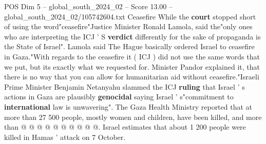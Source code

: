 \begin{textsample}{POS Dim 5 – global\_south\_2024\_02 – Score 13.00 – global\_south\_2024\_02/105742604.txt}
Ceasefire While the \textbf{court} stopped short of using the word"ceasefire"Justice Minister Ronald Lamola, said the"only ones who are interpreting the ICJ ' S \textbf{verdict} differently for the sake of propaganda is the State of Israel".
Lamola said The Hague basically ordered Israel to ceasefire in Gaza."With regards to the ceasefire it ( ICJ ) did not use the same words that we put, but its exactly what we requested for.
Minister Pandor explained it, that there is no way that you can allow for humanitarian aid without ceasefire."Israeli Prime Minister Benjamin Netanyahu slammed the ICJ \textbf{ruling} that Israel ' s actions in Gaza are plausibly \textbf{genocidal} saying Israel ' s"commitment to \textbf{international} law is unwavering".
The Gaza Health Ministry reported that at more than 27 500 people, mostly women and children, have been killed, and more than @ @ @ @ @ @ @ @ @ @.
Israel estimates that about 1 200 people were killed in Hamas ' attack on 7 October.

\end{textsample}
